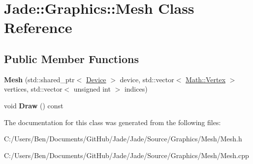 \hypertarget{class_jade_1_1_graphics_1_1_mesh}{}\section{Jade\+:\+:Graphics\+:\+:Mesh Class Reference}
\label{class_jade_1_1_graphics_1_1_mesh}
\subsection*{Public Member Functions}
\begin{DoxyCompactItemize}
\item 
\hypertarget{class_jade_1_1_graphics_1_1_mesh_ab6d72947e96926de3ec277e1d53707a5}{}{\bfseries Mesh} (std\+::shared\+\_\+ptr$<$ \hyperlink{class_jade_1_1_graphics_1_1_device}{Device} $>$ device, std\+::vector$<$ \hyperlink{struct_jade_1_1_math_1_1_vertex}{Math\+::\+Vertex} $>$ vertices, std\+::vector$<$ unsigned int $>$ indices)\label{class_jade_1_1_graphics_1_1_mesh_ab6d72947e96926de3ec277e1d53707a5}

\item 
\hypertarget{class_jade_1_1_graphics_1_1_mesh_aab6996e51de3121c2aa0630208d2c344}{}void {\bfseries Draw} () const \label{class_jade_1_1_graphics_1_1_mesh_aab6996e51de3121c2aa0630208d2c344}

\end{DoxyCompactItemize}


The documentation for this class was generated from the following files\+:\begin{DoxyCompactItemize}
\item 
C\+:/\+Users/\+Ben/\+Documents/\+Git\+Hub/\+Jade/\+Jade/\+Source/\+Graphics/\+Mesh/Mesh.\+h\item 
C\+:/\+Users/\+Ben/\+Documents/\+Git\+Hub/\+Jade/\+Jade/\+Source/\+Graphics/\+Mesh/Mesh.\+cpp\end{DoxyCompactItemize}
